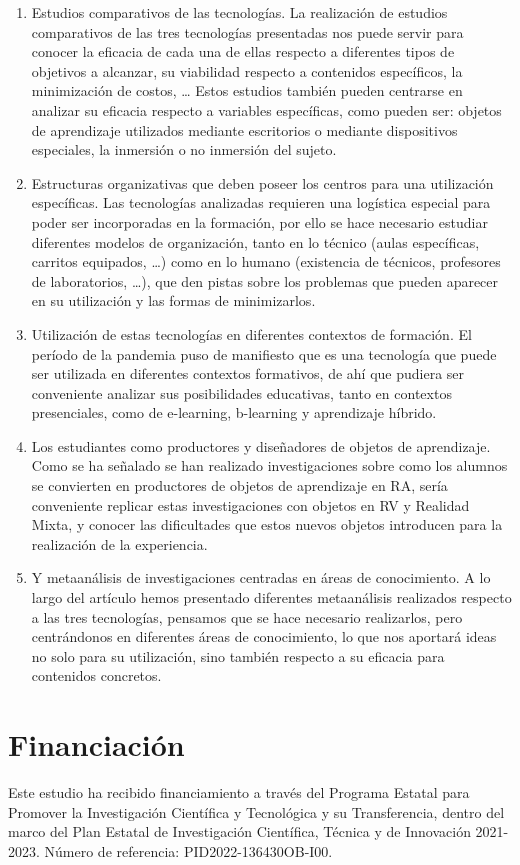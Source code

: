 \documentclass[spanish]{textolivre}
\begin{document}
\begin{enumerate}
\item Estudios comparativos de las tecnologías. La realización de estudios comparativos de las tres tecnologías presentadas nos puede servir para conocer la eficacia de cada una de ellas respecto a diferentes tipos de objetivos a alcanzar, su viabilidad respecto a contenidos específicos, la minimización de costos, … Estos estudios también pueden centrarse en analizar su eficacia respecto a variables específicas, como pueden ser: objetos de aprendizaje utilizados mediante escritorios o mediante dispositivos especiales, la inmersión o no inmersión del sujeto.
\item Estructuras organizativas que deben poseer los centros para una utilización específicas. Las tecnologías analizadas requieren una logística especial para poder ser incorporadas en la formación, por ello se hace necesario estudiar diferentes modelos de organización, tanto en lo técnico (aulas específicas, carritos equipados, …) como en lo humano (existencia de técnicos, profesores de laboratorios, …), que den pistas sobre los problemas que pueden aparecer en su utilización y las formas de minimizarlos.
\item Utilización de estas tecnologías en diferentes contextos de formación. El período de la pandemia puso de manifiesto que es una tecnología que puede ser utilizada en diferentes contextos formativos, de ahí que pudiera ser conveniente analizar sus posibilidades educativas, tanto en contextos presenciales, como de e-learning, b-learning y aprendizaje híbrido.
\item Los estudiantes como productores y diseñadores de objetos de aprendizaje. Como se ha señalado se han realizado investigaciones sobre como los alumnos se convierten en productores de objetos de aprendizaje en RA, sería conveniente replicar estas investigaciones con objetos en RV y Realidad Mixta, y conocer las dificultades que estos nuevos objetos introducen para la realización de la experiencia.
\item Y metaanálisis de investigaciones centradas en áreas de conocimiento. A lo largo del artículo hemos presentado diferentes metaanálisis realizados respecto a las tres tecnologías, pensamos que se hace necesario realizarlos, pero centrándonos en diferentes áreas de conocimiento, lo que nos aportará ideas no solo para su utilización, sino también respecto a su eficacia para contenidos concretos.
\end{enumerate}

\section{Financiación}
Este estudio ha recibido financiamiento a través del Programa Estatal para Promover la Investigación Científica y Tecnológica y su Transferencia, dentro del marco del Plan Estatal de Investigación Científica, Técnica y de Innovación 2021-2023. Número de referencia: PID2022-136430OB-I00.
\end{document}
